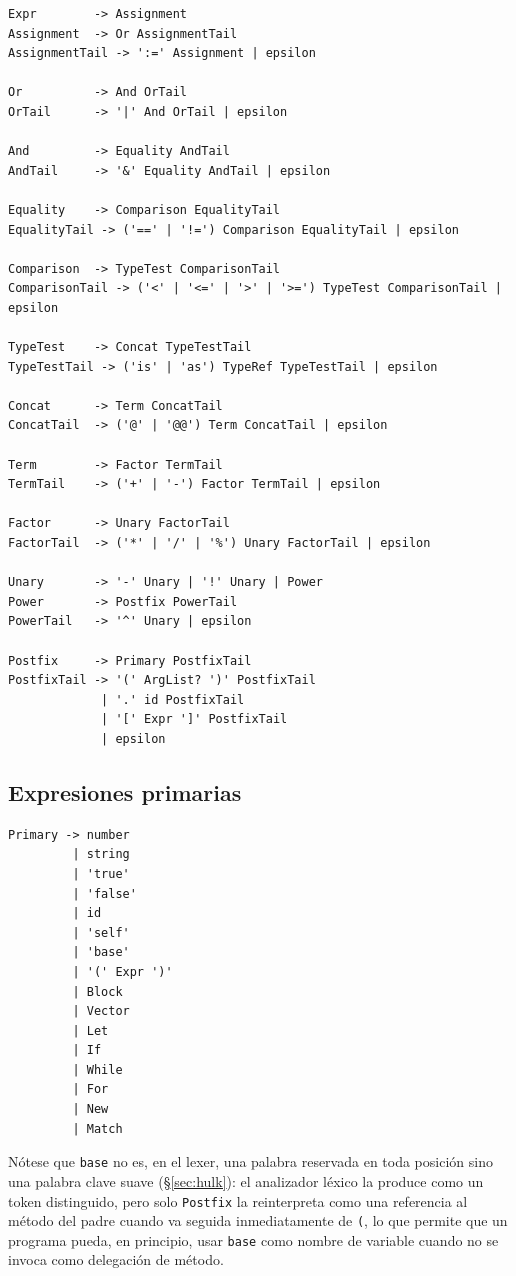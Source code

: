 \documentclass[12pt, a4paper]{article}
\begin{document}
\begin{lstlisting}[language={}]
Expr        -> Assignment
Assignment  -> Or AssignmentTail
AssignmentTail -> ':=' Assignment | epsilon

Or          -> And OrTail
OrTail      -> '|' And OrTail | epsilon

And         -> Equality AndTail
AndTail     -> '&' Equality AndTail | epsilon

Equality    -> Comparison EqualityTail
EqualityTail -> ('==' | '!=') Comparison EqualityTail | epsilon

Comparison  -> TypeTest ComparisonTail
ComparisonTail -> ('<' | '<=' | '>' | '>=') TypeTest ComparisonTail | epsilon

TypeTest    -> Concat TypeTestTail
TypeTestTail -> ('is' | 'as') TypeRef TypeTestTail | epsilon

Concat      -> Term ConcatTail
ConcatTail  -> ('@' | '@@') Term ConcatTail | epsilon

Term        -> Factor TermTail
TermTail    -> ('+' | '-') Factor TermTail | epsilon

Factor      -> Unary FactorTail
FactorTail  -> ('*' | '/' | '%') Unary FactorTail | epsilon

Unary       -> '-' Unary | '!' Unary | Power
Power       -> Postfix PowerTail
PowerTail   -> '^' Unary | epsilon

Postfix     -> Primary PostfixTail
PostfixTail -> '(' ArgList? ')' PostfixTail
             | '.' id PostfixTail
             | '[' Expr ']' PostfixTail
             | epsilon
\end{lstlisting}

\subsection{Expresiones primarias}

\begin{lstlisting}[language={}]
Primary -> number
         | string
         | 'true'
         | 'false'
         | id
         | 'self'
         | 'base'
         | '(' Expr ')'
         | Block
         | Vector
         | Let
         | If
         | While
         | For
         | New
         | Match
\end{lstlisting}

Nótese que \texttt{base} no es, en el lexer, una palabra reservada en toda
posición sino una palabra clave suave (\S\ref{sec:hulk}): el analizador léxico
la produce como un token distinguido, pero solo \texttt{Postfix} la
reinterpreta como una referencia al método del padre cuando va seguida
inmediatamente de \texttt{(}, lo que permite que un programa pueda, en
principio, usar \texttt{base} como nombre de variable cuando no se invoca
como delegación de método.
\end{document}
